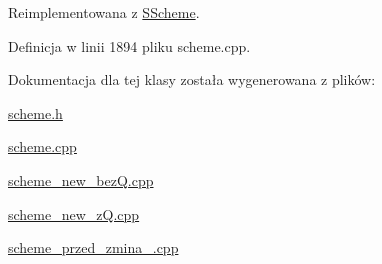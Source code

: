 Reimplementowana z \hyperlink{class_s_scheme_ae1e554b35ec2d8a902f6fdb30d95ab20}{S\+Scheme}.



Definicja w linii 1894 pliku scheme.\+cpp.



Dokumentacja dla tej klasy została wygenerowana z plików\+:\begin{DoxyCompactItemize}
\item 
\hyperlink{scheme_8h}{scheme.\+h}\item 
\hyperlink{scheme_8cpp}{scheme.\+cpp}\item 
\hyperlink{scheme__new__bez_q_8cpp}{scheme\+\_\+new\+\_\+bez\+Q.\+cpp}\item 
\hyperlink{scheme__new__z_q_8cpp}{scheme\+\_\+new\+\_\+z\+Q.\+cpp}\item 
\hyperlink{scheme__przed__zmina__09092015_8cpp}{scheme\+\_\+przed\+\_\+zmina\+\_.\+cpp}\end{DoxyCompactItemize}
